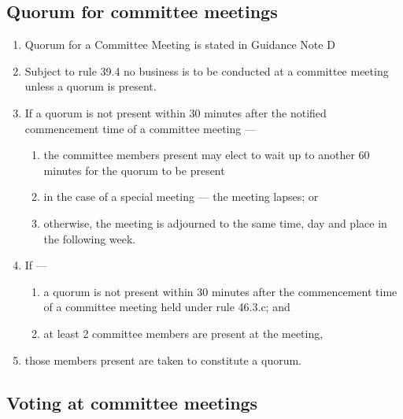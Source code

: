\documentclass[../constitution.tex]{subfiles}
\begin{document}
\hypertarget{quorum-for-committee-meetings}{%
\subsection{Quorum for committee meetings}\label{quorum-for-committee-meetings}}

\begin{enumerate}

\item Quorum for a Committee Meeting is stated in Guidance Note D
\item Subject to rule 39.4 no business is to be conducted at a committee meeting unless a quorum is present.
\item If a quorum is not present within 30 minutes after the notified commencement time of a committee meeting ---

  \begin{enumerate}
  
  \item the committee members present may elect to wait up to another 60 minutes for the quorum to be present
  \item in the case of a special meeting --- the meeting lapses; or
  \item otherwise, the meeting is adjourned to the same time, day and place in the following week.
  \end{enumerate}
\item If ---

  \begin{enumerate}
  
  \item a quorum is not present within 30 minutes after the commencement time of a committee meeting held under rule 46.3.c; and
  \item at least 2 committee members are present at the meeting,
  \end{enumerate}
\item those members present are taken to constitute a quorum.
\end{enumerate}

\hypertarget{voting-at-committee-meetings}{%
\subsection{Voting at committee meetings}\label{voting-at-committee-meetings}}
\end{document}
